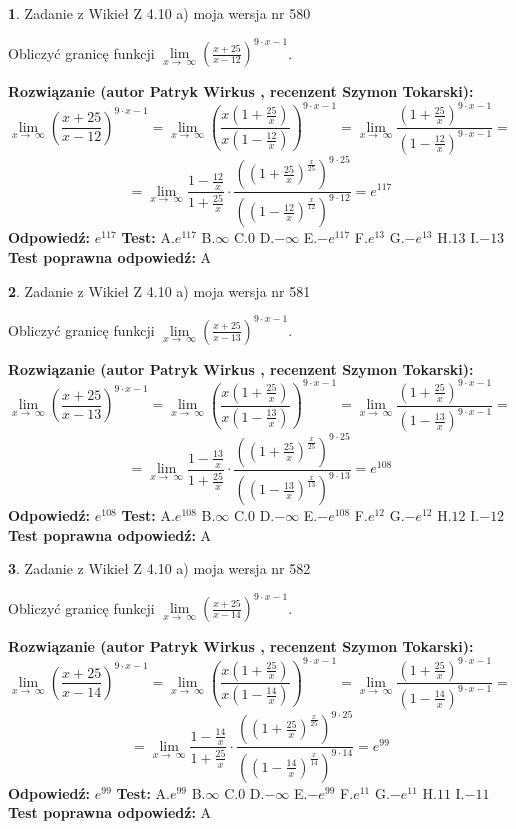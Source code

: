 \documentclass[12pt, a4paper]{article}
\theoremstyle{definition} %
\newtheorem{zad}{}
\newcommand{\zadStart}[1]{\begin{zad}#1\newline}
\newcommand{\zadStop}{\end{zad}}
\newcommand{\rozwStart}[2]{\noindent \textbf{Rozwiązanie (autor #1 , recenzent #2): }\newline}
\newcommand{\rozwStop}{\newline}
\newcommand{\odpStart}{\noindent \textbf{Odpowiedź:}\newline}
\newcommand{\odpStop}{\newline}
\newcommand{\testStart}{\noindent \textbf{Test:}\newline}
\newcommand{\testStop}{\newline}
\newcommand{\kluczStart}{\noindent \textbf{Test poprawna odpowiedź:}\newline}
\newcommand{\kluczStop}{\newline}
\begin{document}
\zadStart{Zadanie z Wikieł Z 4.10 a) moja wersja nr 580}

Obliczyć granicę funkcji  $\lim\limits_{x\to\ \infty}(\frac{x+25}{x-12})^{9\cdot x-1}$.
\zadStop
\rozwStart{Patryk Wirkus}{Szymon Tokarski}
$$\lim\limits_{x\to\ \infty}(\frac{x+25}{x-12})^{9\cdot x-1} = \lim\limits_{x\to\ \infty}(\frac{x(1+\frac{25}{x})}{x(1-\frac{12}{x})})^{9\cdot x-1}=\lim\limits_{x\to\ \infty}\frac{(1+\frac{25}{x})^{9\cdot x-1}}{(1-\frac{12}{x})^{9\cdot x-1}}=$$
$$=\lim\limits_{x\to\ \infty}\frac{1-\frac{12}{x}}{1+\frac{25}{x}}\cdot\frac{((1+\frac{25}{x})^{\frac{x}{25}})^{9\cdot25}}{((1-\frac{12}{x})^{\frac{x}{12}})^{9\cdot12}}=e^{117}$$
\rozwStop
\odpStart
$e^{117}$
\odpStop
\testStart
A.$e^{117}$ B.$\infty$ C.$0$ D.$-\infty$ E.$-e^{117}$
F.$e^{13}$ G.$-e^{13}$
H.$13$
I.$-13$
\testStop
\kluczStart
A
\kluczStop



\zadStart{Zadanie z Wikieł Z 4.10 a) moja wersja nr 581}

Obliczyć granicę funkcji  $\lim\limits_{x\to\ \infty}(\frac{x+25}{x-13})^{9\cdot x-1}$.
\zadStop
\rozwStart{Patryk Wirkus}{Szymon Tokarski}
$$\lim\limits_{x\to\ \infty}(\frac{x+25}{x-13})^{9\cdot x-1} = \lim\limits_{x\to\ \infty}(\frac{x(1+\frac{25}{x})}{x(1-\frac{13}{x})})^{9\cdot x-1}=\lim\limits_{x\to\ \infty}\frac{(1+\frac{25}{x})^{9\cdot x-1}}{(1-\frac{13}{x})^{9\cdot x-1}}=$$
$$=\lim\limits_{x\to\ \infty}\frac{1-\frac{13}{x}}{1+\frac{25}{x}}\cdot\frac{((1+\frac{25}{x})^{\frac{x}{25}})^{9\cdot25}}{((1-\frac{13}{x})^{\frac{x}{13}})^{9\cdot13}}=e^{108}$$
\rozwStop
\odpStart
$e^{108}$
\odpStop
\testStart
A.$e^{108}$ B.$\infty$ C.$0$ D.$-\infty$ E.$-e^{108}$
F.$e^{12}$ G.$-e^{12}$
H.$12$
I.$-12$
\testStop
\kluczStart
A
\kluczStop



\zadStart{Zadanie z Wikieł Z 4.10 a) moja wersja nr 582}

Obliczyć granicę funkcji  $\lim\limits_{x\to\ \infty}(\frac{x+25}{x-14})^{9\cdot x-1}$.
\zadStop
\rozwStart{Patryk Wirkus}{Szymon Tokarski}
$$\lim\limits_{x\to\ \infty}(\frac{x+25}{x-14})^{9\cdot x-1} = \lim\limits_{x\to\ \infty}(\frac{x(1+\frac{25}{x})}{x(1-\frac{14}{x})})^{9\cdot x-1}=\lim\limits_{x\to\ \infty}\frac{(1+\frac{25}{x})^{9\cdot x-1}}{(1-\frac{14}{x})^{9\cdot x-1}}=$$
$$=\lim\limits_{x\to\ \infty}\frac{1-\frac{14}{x}}{1+\frac{25}{x}}\cdot\frac{((1+\frac{25}{x})^{\frac{x}{25}})^{9\cdot25}}{((1-\frac{14}{x})^{\frac{x}{14}})^{9\cdot14}}=e^{99}$$
\rozwStop
\odpStart
$e^{99}$
\odpStop
\testStart
A.$e^{99}$ B.$\infty$ C.$0$ D.$-\infty$ E.$-e^{99}$
F.$e^{11}$ G.$-e^{11}$
H.$11$
I.$-11$
\testStop
\kluczStart
A
\kluczStop
\end{document}
